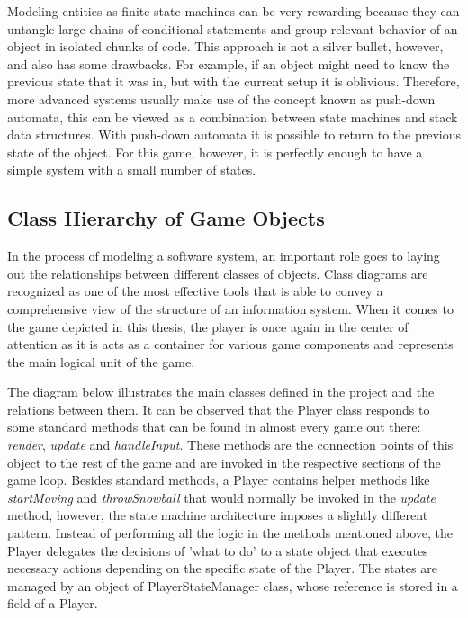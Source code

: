 Modeling entities as finite state machines can be very rewarding because they
can untangle large chains of conditional statements and group relevant behavior
of an object in isolated chunks of code. This approach is not a silver bullet,
however, and also has some drawbacks. For example, if an object might need to
know the previous state that it was in, but with the current setup it is
oblivious. Therefore, more advanced systems usually make use of the concept
known as push-down automata, this can be viewed as a combination between state
machines and stack data structures. With push-down automata it is possible to
return to the previous state of the object. For this game, however, it is
perfectly enough to have a simple system with a small number of states.

\newpage

\subsection{Class Hierarchy of Game Objects}

In the process of modeling a software system, an important role goes to laying
out the relationships between different classes of objects. Class diagrams are
recognized as one of the most effective tools that is able to convey a
comprehensive view of the structure of an information system. When it comes to
the game depicted in this thesis, the player is once again in the center of
attention as it is acts as a container for various game components and
represents the main logical unit of the game.

The diagram below illustrates the main classes defined in the project and the
relations between them. It can be observed that the Player class responds to
some standard methods that can be found in almost every game out there:
\emph{render}, \emph{update} and \emph{handleInput}. These methods are the
connection points of this object to the rest of the game and are invoked in the
respective sections of the game loop. Besides standard methods, a Player
contains helper methods like \emph{startMoving} and \emph{throwSnowball} that
would normally be invoked in the \emph{update} method, however, the state
machine architecture imposes a slightly different pattern. Instead of performing
all the logic in the methods mentioned above, the Player delegates the decisions
of 'what to do' to a state object that executes necessary actions depending on
the specific state of the Player. The states are managed by an object of
PlayerStateManager class, whose reference is stored in a field of a Player.

